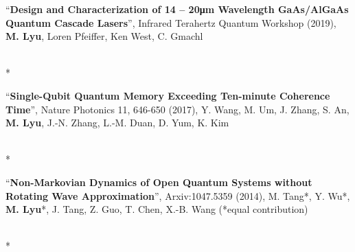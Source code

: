 \documentclass[localFont,alternative]{yaac-another-awesome-cv}
\begin{document}
\newcommand\publication[3]{
  \begin{minipage}[t]{\dimexpr(\linewidth) - 1.5em}
    ``\textbf{#1}'', #2, #3
  \end{minipage}
  \\*
}
\publication{Design and Characterization of 14 – 20μm Wavelength GaAs/AlGaAs
Quantum Cascade Lasers}{Infrared Terahertz Quantum Workshop (2019)}
{\textbf{M. Lyu}, Loren Pfeiffer, Ken West, C. Gmachl}
\publication{Single-Qubit Quantum Memory Exceeding Ten-minute Coherence Time}
  {Nature Photonics 11, 646-650 (2017)}{Y. Wang, M. Um, J. Zhang, S. An, 
    \textbf{M. Lyu}, J.-N. Zhang, L.-M. Duan, D. Yum, K. Kim}
\publication{Non-Markovian Dynamics of Open Quantum Systems without Rotating 
  Wave Approximation}{Arxiv:1047.5359 (2014)}{M. Tang*, Y. Wu*, 
  \textbf{M. Lyu}*, J. Tang, Z. Guo, T. Chen, X.-B. Wang 
  (*equal contribution)}


\newcommand\project[5]{
  \begin{minipage}[t]{\dimexpr(\linewidth) - 1.5em}
    \textbf{\textsc{#1}} \hfill \textsc{#2}\smallskip\\
    #3\\
    #4\smallskip\\
    \footnotesize{\foreach \n in {#5}{\cvtag{\n}}}\\
  \end{minipage}
  \\*
}
\end{document}
